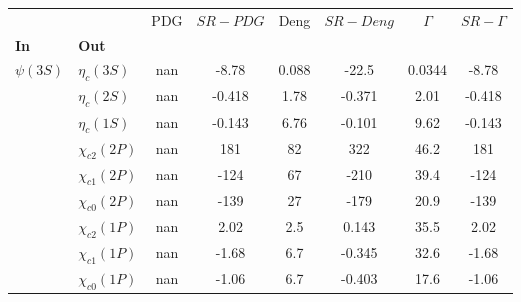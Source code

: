 \begin{tabular}{l|l|c|c|c|c|c|c}
\toprule
           &                 &  PDG &  $SR-PDG$ &  Deng &  $SR-Deng$ &  $\Gamma$ &  $SR-\Gamma$ \\
\textbf{In} & \textbf{Out} &      &           &       &            &           &              \\
\midrule
\textbf{$\psi(3S)$} & \textbf{$\eta_{c}(3S)$} &  nan &     -8.78 & 0.088 &      -22.5 &    0.0344 &        -8.78 \\
           & \textbf{$\eta_{c}(2S)$} &  nan &    -0.418 &  1.78 &     -0.371 &      2.01 &       -0.418 \\
           & \textbf{$\eta_{c}(1S)$} &  nan &    -0.143 &  6.76 &     -0.101 &      9.62 &       -0.143 \\
           & \textbf{$\chi_{c2}(2P)$} &  nan &       181 &    82 &        322 &      46.2 &          181 \\
           & \textbf{$\chi_{c1}(2P)$} &  nan &      -124 &    67 &       -210 &      39.4 &         -124 \\
           & \textbf{$\chi_{c0}(2P)$} &  nan &      -139 &    27 &       -179 &      20.9 &         -139 \\
           & \textbf{$\chi_{c2}(1P)$} &  nan &      2.02 &   2.5 &      0.143 &      35.5 &         2.02 \\
           & \textbf{$\chi_{c1}(1P)$} &  nan &     -1.68 &   6.7 &     -0.345 &      32.6 &        -1.68 \\
           & \textbf{$\chi_{c0}(1P)$} &  nan &     -1.06 &   6.7 &     -0.403 &      17.6 &        -1.06 \\
\bottomrule
\end{tabular}
